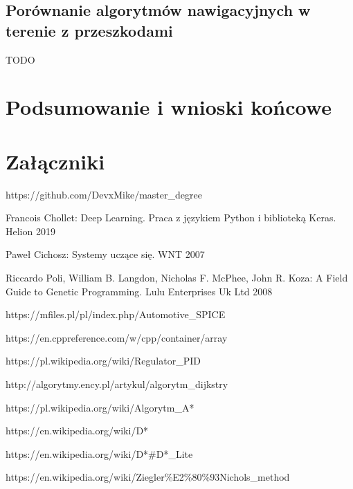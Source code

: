 \documentclass[12pt,twoside]{article}
\begin{document}
\subsection{Porównanie algorytmów nawigacyjnych w terenie z przeszkodami}
TODO
\section{Podsumowanie i wnioski końcowe}

\section*{Załączniki}



\clearpage


\begin{thebibliography}{12}
 https://github.com/DevxMike/master\_degree

 Francois Chollet: Deep Learning. Praca z językiem Python i biblioteką Keras. Helion 2019

 Paweł Cichosz: Systemy uczące się. WNT 2007 

  Riccardo Poli, William B. Langdon, Nicholas F. McPhee, John R. Koza: A Field Guide to Genetic Programming. Lulu Enterprises Uk Ltd 2008

 https://mfiles.pl/pl/index.php/Automotive\_SPICE

 https://en.cppreference.com/w/cpp/container/array

 https://pl.wikipedia.org/wiki/Regulator\_PID

 http://algorytmy.ency.pl/artykul/algorytm\_dijkstry

 https://pl.wikipedia.org/wiki/Algorytm\_A*

 https://en.wikipedia.org/wiki/D*

 https://en.wikipedia.org/wiki/D*\#D*\_Lite

 https://en.wikipedia.org/wiki/Ziegler\%E2\%80\%93Nichols\_method

\end{thebibliography}

\clearpage

\makesummary
\end{document}

